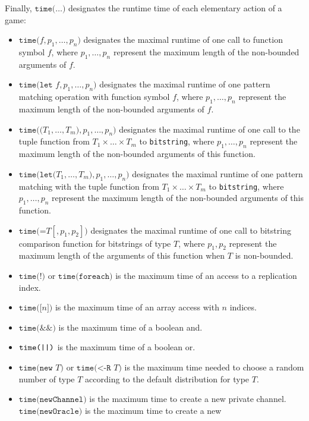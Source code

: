 Finally, $\texttt{time(}\ldots\texttt{)}$ designates the runtime time of each
elementary action of a game:
\begin{itemize}
\item
$\texttt{time(}f, p_1, \ldots, p_n\texttt{)}$ designates the maximal runtime of
one call to function symbol $f$, where $p_1, \ldots, \allowbreak p_n$ represent
the maximum length of the non-bounded arguments of $f$.
\item
$\texttt{time(let }f, p_1, \ldots, p_n\texttt{)}$ designates the
maximal runtime of one pattern matching operation with function symbol
$f$, where $p_1, \ldots, p_n$ represent the maximum length of the
non-bounded arguments of $f$.
\item
$\texttt{time((}T_1, \ldots, T_m\texttt{)}, p_1, \ldots, p_n\texttt{)}$ designates the
maximal runtime of one call to the tuple function from $T_1 \times
\ldots \times T_m$ to \texttt{bitstring}, where $p_1, \ldots, p_n$
represent the maximum length of the non-bounded arguments of this
function.
\item
$\texttt{time(let(}T_1, \ldots, T_m\texttt{)}, p_1, \ldots, p_n\texttt{)}$ designates the
maximal runtime of one pattern matching with the tuple function from
$T_1 \times \ldots \times T_m$ to \texttt{bitstring}, where $p_1, \ldots, p_n$
represent the maximum length of the non-bounded arguments of this function.
\item
$\texttt{time(=}T[, p_1, p_2]\texttt{)}$ designates the
maximal runtime of one call to bitstring comparison function
for bitstrings of type $T$, where $p_1, p_2$ represent the
maximum length of the arguments of this function when $T$ is non-bounded.
\item
$\texttt{time(!)}$ or $\texttt{time(foreach)}$ is the maximum time of an access to a replication index.
\item
$\texttt{time([}n\texttt{])}$ is the maximum time of an array access 
with $n$ indices.
\item
$\texttt{time(\&\&)}$ is the maximum time of a boolean and.
\item
$\texttt{time(\string|\string|)}$ is the maximum time of a boolean or.
\item
$\texttt{time(new }T\texttt{)}$ or $\texttt{time(<-R }T\texttt{)}$ 
is the maximum time needed to choose
a random number of type $T$ according to the default distribution for type $T$.
\item
\ifchannels
$\texttt{time(newChannel)}$ is the maximum time to create a new
private channel.
\else
$\texttt{time(newOracle)}$ is the maximum time to create a new

\end{itemize}
